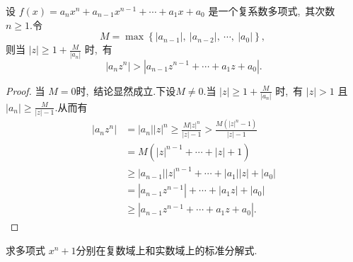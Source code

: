 \newpage
\begin{problem}
	设  $f(x)=a_{n} x^{n}+a_{n-1} x^{n-1}+\cdots+a_{1} x+a_{0}$  是一个复系数多项式,\  其次数 $ n \geqslant 1  .$令
	$$M=\max \left\{\left|a_{n-1}\right|,\ \left|a_{n-2}\right|,\  \cdots,\ \left|a_{0}\right|\right\},\ $$
	则当 $ |z| \geqslant 1+\frac{M}{\left|a_{n}\right|} $ 时,\  有
	$$\left|a_{n} z^{n}\right|>\left|a_{n-1} z^{n-1}+\cdots+a_{1} z+a_{0}\right| .$$
\end{problem}
\begin{proof}
	当 $ M=0  $时,\  结论显然成立.下设$  M \neq 0  .$当 $ |z| \geqslant 1+\frac{M}{\left|a_{n}\right|} $ 时,\  有 $ |z|>1$  且 $ \left|a_{n}\right|   \geqslant \frac{M}{|z|-1}  .$从而有
	$$\begin{aligned}
		\left|a_{n} z^{n}\right| & =\left|a_{n}\right||z|^{n} \geqslant \frac{M|z|^{n}}{|z|-1}>\frac{M\left(|z|^{n}-1\right)}{|z|-1} \\
		& =M\left(|z|^{n-1}+\cdots+|z|+1\right) \\
		& \geqslant\left|a_{n-1}\right||z|^{n-1}+\cdots+\left|a_{1}\right||z|+\left|a_{0}\right| \\
		& =\left|a_{n-1} z^{n-1}\right|+\cdots+\left|a_{1} z\right|+\left|a_{0}\right| \\
		& \geqslant\left|a_{n-1} z^{n-1}+\cdots+a_{1} z+a_{0}\right| .
	\end{aligned}$$
\end{proof}
\newpage
\begin{problem}
	求多项式  $x^{n}+1  分$别在复数域上和实数域上的标准分解式.
\end{problem}
